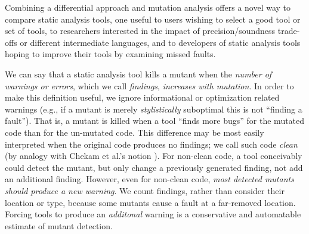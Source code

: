 Combining a differential approach and mutation analysis offers a novel way to compare static analysis tools, one useful to users wishing to select a good tool or set of tools, to researchers interested in the impact of precision/soundness trade-offs or different intermediate languages, and to developers of static analysis tools hoping to improve their tools by examining missed faults.


We can say that a static analysis tool kills a mutant when the \emph{number of warnings or errors}, which we call \emph{findings}, \emph{increases with mutation}.  In order to make this definition useful, we ignore informational or optimization related warnings (e.g., if a mutant is merely \emph{stylistically} suboptimal this is not ``finding a fault''). That is, a mutant is killed when a tool ``finds more bugs'' for the mutated code than for the un-mutated code.  This difference may be most easily interpreted when the original code produces no findings; we call such code \emph{clean} (by analogy with Chekam et al.'s notion \cite{CleanProgram}). For non-clean code, a tool conceivably could detect the mutant, but only change a previously generated finding, not add an additional finding.  However, even for non-clean code, \emph{most detected mutants should produce a new warning}.  We count findings, rather than consider their location or type, because some mutants cause a fault at a far-removed location.  Forcing tools to produce an \emph{additonal} warning is a conservative and automatable estimate of mutant detection.


